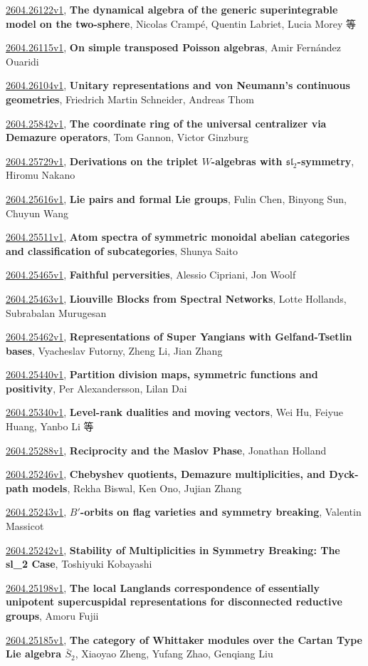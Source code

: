 \documentclass[9pt, a4paper]{article}
\theoremstyle{plain}
\theoremstyle{definition}
\theoremstyle{remark}
\newcommand{\arxiv}[3]{\href{https://arxiv.org/abs/#1}{#1}, \textbf{\textcolor{arxivblue}{#2}}, #3}
\begin{document}
\arxiv{2604.26122v1}{The dynamical algebra of the generic superintegrable model on the two-sphere}{Nicolas Crampé, Quentin Labriet, Lucia Morey 等}

\arxiv{2604.26115v1}{On simple transposed Poisson algebras}{Amir Fernández Ouaridi}

\arxiv{2604.26104v1}{Unitary representations and von Neumann's continuous geometries}{Friedrich Martin Schneider, Andreas Thom}

\arxiv{2604.25842v1}{The coordinate ring of the universal centralizer via Demazure operators}{Tom Gannon, Victor Ginzburg}

\arxiv{2604.25729v1}{Derivations on the triplet $W$-algebras with $\mathfrak{sl}_2$-symmetry}{Hiromu Nakano}

\arxiv{2604.25616v1}{Lie pairs and formal Lie groups}{Fulin Chen, Binyong Sun, Chuyun Wang}

\arxiv{2604.25511v1}{Atom spectra of symmetric monoidal abelian categories and classification of subcategories}{Shunya Saito}

\arxiv{2604.25465v1}{Faithful perversities}{Alessio Cipriani, Jon Woolf}

\arxiv{2604.25463v1}{Liouville Blocks from Spectral Networks}{Lotte Hollands, Subrabalan Murugesan}

\arxiv{2604.25462v1}{Representations of Super Yangians with Gelfand-Tsetlin bases}{Vyacheslav Futorny, Zheng Li, Jian Zhang}

\arxiv{2604.25440v1}{Partition division maps, symmetric functions and positivity}{Per Alexandersson, Lilan Dai}

\arxiv{2604.25340v1}{Level-rank dualities and moving vectors}{Wei Hu, Feiyue Huang, Yanbo Li 等}

\arxiv{2604.25288v1}{Reciprocity and the Maslov Phase}{Jonathan Holland}

\arxiv{2604.25246v1}{Chebyshev quotients, Demazure multiplicities, and Dyck-path models}{Rekha Biswal, Ken Ono, Jujian Zhang}

\arxiv{2604.25243v1}{$B'$-orbits on flag varieties and symmetry breaking}{Valentin Massicot}

\arxiv{2604.25242v1}{Stability of Multiplicities in Symmetry Breaking: The sl_2 Case}{Toshiyuki Kobayashi}

\arxiv{2604.25198v1}{The local Langlands correspondence of essentially unipotent supercuspidal representations for disconnected reductive groups}{Amoru Fujii}

\arxiv{2604.25185v1}{The category of Whittaker modules over the Cartan Type Lie algebra $\bar{S}_2$}{Xiaoyao Zheng, Yufang Zhao, Genqiang Liu}
\end{document}
